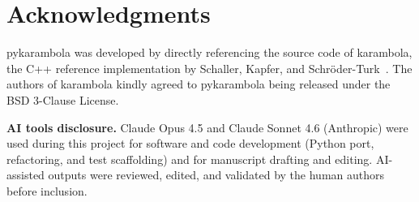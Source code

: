 \documentclass[unnumsec,webpdf,contemporary,large,namedate]{oup-authoring-template}
\begin{document}
\section{Acknowledgments}
pykarambola was developed by directly referencing the source code of karambola, the C++ reference implementation by Schaller, Kapfer, and Schr\"{o}der-Turk~\citep{Schaller2020karambola}.
The authors of karambola kindly agreed to pykarambola being released under the BSD 3-Clause License.

\textbf{AI tools disclosure.}
Claude Opus 4.5 and Claude Sonnet 4.6 (Anthropic) were used during this project for software and code development (Python port, refactoring, and test scaffolding) and for manuscript drafting and editing.
AI-assisted outputs were reviewed, edited, and validated by the human authors before inclusion.



\end{document}
